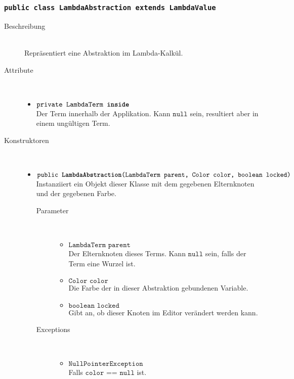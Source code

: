 \subsubsection{\normalfont \texttt{public class \textbf{LambdaAbstraction} extends LambdaValue}}

\begin{description}
\item[Beschreibung] \hfill \\ Repräsentiert eine Abstraktion im Lambda-Kalkül.
\item[Attribute] \hfill \\
	\vspace{-.8cm}
	\begin{itemize}
		\item $\texttt{private LambdaTerm \textbf{inside}}$ \\ Der Term innerhalb der Applikation. Kann $\texttt{null}$ sein, resultiert aber in einem ungültigen Term.
	\end{itemize}
	
\item[Konstruktoren] \hfill \\
	\vspace{-.8cm}
	\begin{itemize}
		\item $\texttt{public \textbf{LambdaAbstraction}(LambdaTerm parent, Color color, boolean locked)}$ \\ Instanziiert ein Objekt dieser Klasse mit dem gegebenen Elternknoten und der gegebenen Farbe.
		\begin{description}
			\item[Parameter] \hfill \\
			\vspace{-.8cm}
			\begin{itemize}
				\item $\texttt{LambdaTerm parent}$ \\ Der Elternknoten dieses Terms. Kann $\texttt{null}$ sein, falls der Term eine Wurzel ist.
				\item $\texttt{Color color}$ \\ Die Farbe der in dieser Abstraktion gebundenen Variable.
				\item $\texttt{boolean locked}$ \\ Gibt an, ob dieser Knoten im Editor verändert werden kann.
			\end{itemize}
			\item[Exceptions] \hfill \\
			\vspace{-.8cm}
			\begin{itemize}
				\item $\texttt{NullPointerException}$ \\ Falls $\texttt{color == null}$ ist.
			\end{itemize}
		\end{description}
	\end{itemize}
	

\end{description}
